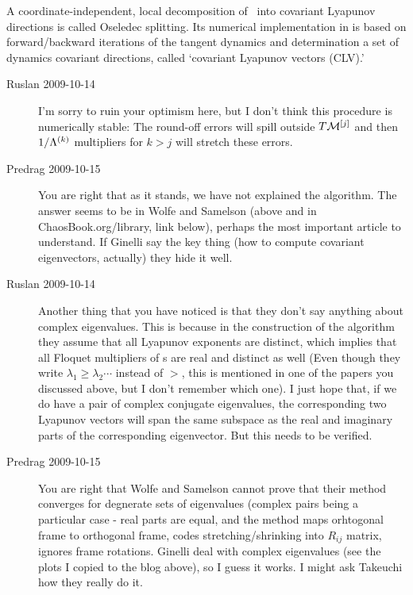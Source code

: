 A coordinate-independent, local decomposition of \statesp\
into covariant Lyapunov directions is called Oseledec
splitting.
Its numerical implementation in 
is based on forward/backward
iterations of the tangent dynamics and determination
a set of dynamics covariant directions,
called `covariant Lyapunov vectors (CLV).'

\begin{description}
  \item[Ruslan 2009-10-14] I'm sorry to ruin your optimism
      here, but I don't think this procedure is numerically
      stable: The round-off errors will spill outside
      $T{\cal M}^{[j]}$ and then $1/\Lambda^{(k)}$ multipliers
      for $k > j$ will stretch these errors.

\item[Predrag 2009-10-15]
You are right that as it stands, we have not explained the
algorithm. The answer seems to be in Wolfe and
Samelson (above and in ChaosBook.org/library, link
below), perhaps the most important article to understand.
If Ginelli \etal{} say the key thing (how
to compute covariant eigenvectors, actually) they hide it
well.

  \item[Ruslan 2009-10-14]
Another thing that you have noticed is that they don't say
anything about complex eigenvalues.  This is because in the
construction of the algorithm they assume that all Lyapunov
exponents are distinct, which implies that all Floquet
multipliers of {\po s} are real and distinct as well
(Even though they write $\lambda_1 \geq \lambda_2 \cdots$
instead of $>$, this is mentioned in one of the papers you
discussed above, but I don't remember which one).  I just
hope that, if we do have a pair of complex conjugate
eigenvalues, the corresponding two Lyapunov vectors will span
the same subspace as the real and imaginary parts of the
corresponding eigenvector.  But this needs to be verified.

\item[Predrag 2009-10-15]
You are right that Wolfe and Samelson cannot prove
that their method converges for degnerate sets of eigenvalues
(complex pairs being a particular case - real parts are
equal, and the method maps orhtogonal frame to orthogonal
frame, codes stretching/shrinking into $R_{ij}$ matrix,
ignores frame rotations. Ginelli \etal{}
deal with complex eigenvalues (see the plots I copied to the
blog above), so I guess it works. I might ask Takeuchi how
they really do it.


\end{description}

